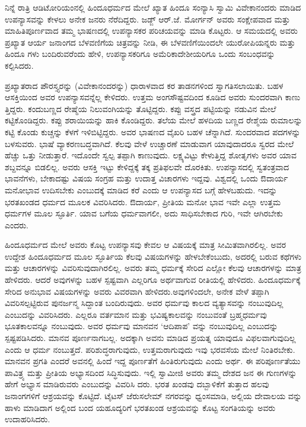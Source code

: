 ನಿನ್ನೆ ರಾತ್ರಿ ಆಡಿಟೋರಿಯಂನಲ್ಲಿ ಹಿಂದೂಧರ್ಮದ ಮೇಲೆ ಖ್ಯಾತ ಹಿಂದೂ ಸಂನ್ಯಾಸಿ ಸ್ವಾಮಿ ವಿವೇಕಾನಂದರು ಮಾಡಿದ ಉಪನ್ಯಾಸವನ್ನು ಕೇಳಲು ಅನೇಕ ಜನರು ನೆರೆದಿದ್ದರು. ಜಡ್ಜ್​ ಆರ್​.ಜೆ. ಮೋರ್ಗನ್​ ಅವರು ಸಂಕ್ಷೇಪವಾದ ಮತ್ತು ಮಾಹಿತಿಪೂರ್ಣವಾದ ತಮ್ಮ ಭಾಷಣದಲ್ಲಿ ಉಪನ್ಯಾಸಕರ ಪರಿಚಯವನ್ನು ಮಾಡಿ ಕೊಟ್ಟರು. ಆ ಸಮಯದಲ್ಲಿ ಅವರು ಪ್ರಖ್ಯಾತ ಆರ್ಯ ಜನಾಂಗದ ಬೆಳವಣಿಗೆಯ ಚಿತ್ರವನ್ನು ನೀಡಿ, ಈ ಬೆಳವಣಿಗೆಯಿಂದಲೇ ಯುರೋಪಿಯನ್ನರು ಮತ್ತು ಹಿಂದೂ ಗಳು ಬಂದಿರುವರೆಂದು ಹೇಳಿ, ಉಪನ್ಯಾಸಕರಿಗೂ ಅಮೆರಿಕಾದೇಶೀಯರಿಗೂ ಒಂದು ಸಂಬಂಧವನ್ನು ಕಲ್ಪಿಸಿದರು.

ಪ್ರಖ್ಯಾತರಾದ ಪೌರಸ್ತ್ಯರನ್ನು (ವಿವೇಕಾನಂದರನ್ನು) ಧಾರಾಳವಾದ ಕರ ತಾಡನಗಳಿಂದ ಸ್ವಾಗತಿಸಲಾಯಿತು. ಬಹಳ ಆಸಕ್ತಿಯಿಂದ ಅವರ ಉಪನ್ಯಾಸವನ್ನೆಲ್ಲ ಕೇಳಿದರು. ಉತ್ತಮ ಅಂಗಸೌಷ್ಟವದಿಂದ ಕೂಡಿದ ಅವರು ಸುಂದರವಾಗಿ ಕಾಣು ತ್ತಿದ್ದರು. ಕಂದುಬಣ್ಣದ ರೇಷ್ಮೆಯ ನಿಲುವಂಗಿಯನ್ನು ತೊಟ್ಟಿದ್ದರು. ಕಪ್ಪು ವಸ್ತ್ರದ ಪಟ್ಟಿಯನ್ನು ನಡುವಿನ ಮೇಲೆ ಕಟ್ಟಿಕೊಂಡಿದ್ದರು. ಕಪ್ಪು ಶರಾಯಿಯನ್ನು ಹಾಕಿ ಕೊಂಡಿದ್ದರು. ತಲೆಯ ಮೇಲೆ ಹಳದಿಯ ಬಣ್ಣದ ರೇಶ್ಮೆಯ ರುಮಾಲನ್ನು ಕಟ್ಟಿ ಕೊಂಡು ಕುಚ್ಚನ್ನು ಕೆಳಗೆ ಇಳಿಬಿಟ್ಟಿದ್ದರು. ಅವರ ಭಾಷಣದ ವೈಖರಿ ಬಹಳ ಚೆನ್ನಾಗಿದೆ. ಸುಂದರವಾದ ಪದಗಳನ್ನು ಬಳಸುವರು. ಭಾಷೆ ವ್ಯಾಕರಣಬದ್ಧವಾಗಿದೆ. ಕೆಲವು ವೇಳೆ ಉಚ್ಚಾರಣೆ ಮಾಡುವಾಗ ಯಾವುದಾದರೂ ಸ್ವರದ ಮೇಲೆ ಹೆಚ್ಚು ಒತ್ತು ನೀಡುತ್ತಾರೆ. ಇದೊಂದೇ ಸ್ವಲ್ಪ ತಪ್ಪಾಗಿ ಕಾಣುವುದು. ಲಕ್ಷ್ಯವಿಟ್ಟು ಕೇಳುತ್ತಿದ್ದ ಶೋತೃಗಳು ಅವರ ಯಾವ ಶಬ್ದವನ್ನೂ ಬಿಡಲಿಲ್ಲ. ಅವರು ಆಸಕ್ತಿ ಇಟ್ಟು ಕೇಳಿದ್ದಕ್ಕೆ ತಕ್ಕ ಪ್ರತಿಫಲವೇ ದೊರಕಿತು. ಉಪನ್ಯಾಸದಲ್ಲಿ ಸ್ವತಂತ್ರವಾದ ಭಾವನೆಗಳು, ಬೇಕಾದಷ್ಟು ವಿಷಯ ಸಂಗ್ರಹ ಮತ್ತು ಉದಾತ್ತ ವಿಚಾರಗಳು ಇದ್ದವು. ವಿಶ್ವದಲ್ಲಿ ಒಂದು ಔದಾರ್ಯ ಮನೋಭಾವ ಉದಿಸಬೇಕು ಎಂಬುದಕ್ಕೆ ಮಾಡಿದ ಕರೆ ಎಂದು ಆ ಉಪನ್ಯಾಸದ ಬಗ್ಗೆ ಹೇಳಬಹುದು. ಇದನ್ನು ಭರತಖಂಡದ ಧರ್ಮದ ಮೂಲಕ ವಿವರಿಸಿದರು. ಔದಾರ್ಯ, ಪ್ರೀತಿಯ ಮನೋ ಭಾವ ಇವೇ ಎಲ್ಲಾ ಉತ್ತಮ ಧರ್ಮಗಳ ಮೂಲ ಸ್ಫೂರ್ತಿ. ಯಾವ ಬಗೆಯ ಧರ್ಮವಾಗಲೀ, ಅದು ಸಾಧಿಸಬೇಕಾದ ಗುರಿ, ಇವೇ ಆಗಿರಬೇಕು ಎಂದರು.

ಹಿಂದೂಧರ್ಮದ ಮೇಲೆ ಅವರು ಕೊಟ್ಟ ಉಪನ್ಯಾಸವು ಕೇವಲ ಆ ವಿಷಯಕ್ಕೆ ಮಾತ್ರ ಸೀಮಿತವಾಗಿರಲಿಲ್ಲ. ಅವರ ಉದ್ದೇಶ ಹಿಂದೂಧರ್ಮದ ಮೂಲ ಸ್ಫೂರ್ತಿಯ ಕೆಲವು ವಿಷಯಗಳನ್ನು ಹೇಳಬೇಕೆಂಬುದು, ಅದರಲ್ಲಿ ಬರುವ ಕಥೆಗಳು ಮತ್ತು ಆಚಾರಗಳನ್ನು ವಿವರಿಸುವುದಾಗಿರಲಿಲ್ಲ. ಅವರು ತಮ್ಮ ಧರ್ಮಕ್ಕೆ ಸೇರಿದ ಎಲ್ಲೋ ಕೆಲವು ಆಚಾರಗಳನ್ನು ಮಾತ್ರ ಹೇಳಿದರು. ಆದರೆ ಅವುಗಳನ್ನು ಬಹಳ ಸ್ಪಷ್ಟವಾಗಿ ಎಲ್ಲರಿಗೂ ಅರ್ಥವಾಗುವ ರೀತಿಯಲ್ಲಿ ಹೇಳಿದರು. ಹಿಂದೂಧರ್ಮಕ್ಕೆ ಸೇರಿದ ಅನುಭಾವ ವಿಷಯಗಳನ್ನು ಅವರು ವಿವರವಾಗಿ ಹೇಳಿದರು.ಅವುಗಳಿಂದಲೇ, ಅನೇಕ ವೇಳೆ ತಪ್ಪಾಗಿ ವಿವರಿಸಲ್ಪಟ್ಟಿರುವ ಪುನರ್ಜನ್ಮ ಸಿದ್ದಾಂತ ಬಂದಿರುವುದು. ಅವರ ಧರ್ಮವು ಕಾಲದ ವ್ಯತ್ಯಾಸವನ್ನು ನಂಬುವುದಿಲ್ಲ ಎಂಬುದನ್ನು ವಿವರಿಸಿದರು. ಎಲ್ಲರೂ ವರ್ತಮಾನ ಮತ್ತು ಭವಿಷ್ಯಕಾಲವನ್ನು ನಂಬುವಂತೆ ಬ್ರಹ್ಮಧರ್ಮವು ಭೂತಕಾಲವನ್ನೂ ನಂಬುವುದು. ಅವರ ಧರ್ಮವು ಮಾನವನ ‘ಆದಿಪಾಪ’ ವನ್ನು ನಂಬುವುದಿಲ್ಲ ಎಂಬುದನ್ನು ಸ್ಪಷ್ಟಪಡಿಸಿದರು. ಮಾನವ ಪೂರ್ಣನಾಗಬಲ್ಲ. ಅದಕ್ಕಾಗಿ ಅವನು ಮಾಡಿದ ಪ್ರಯತ್ನ ಯಾವುದೂ ವಿಫಲವಾಗುವುದಿಲ್ಲ ಎಂದು ಆ ಧರ್ಮ ನಂಬುತ್ತದೆ. ಪರಿಶುದ್ಧರಾಗುವುದು, ಉತ್ತಮರಾಗುವುದು ಇವು ಭರವಸೆಯ ಮೇಲೆ ನಿಂತಿರಬೇಕು. ಮಾನವನ ಪ್ರಗತಿ ಎಂದರೆ ಅವನಲ್ಲಿ ಹಿಂದೆ ಇದ್ದ ಪೂರ್ಣತೆಗೆ ಹಿಂತಿರುಗುವುದು ಎಂದು ಅರ್ಥ. ಈ ಪರಿಪೂರ್ಣತೆಯು ಪಾವಿತ್ರ್ಯ ಮತ್ತು ಪ್ರೀತಿಯ ಅಭ್ಯಾಸದಿಂದ ಸಿದ್ಧಿಸುವುದು. ಇಲ್ಲಿ ಸ್ವಾಮೀಜಿ ಅವರು ತಮ್ಮ ದೇಶದ ಜನ ಈ ಗುಣಗಳನ್ನು ಹೇಗೆ ಅಭ್ಯಾಸ ಮಾಡಿರುವರು ಎಂಬುದನ್ನು ವಿವರಿಸಿ ದರು. ಭರತ ಖಂಡವು ದಬ್ಬಾಳಿಕೆಗೆ ತುತ್ತಾದ ಹಲವು ಜನಾಂಗಗಳಿಗೆ ಆಶ್ರಯವನ್ನು ಕೊಟ್ಟಿದೆ. ಟೈಟಸ್​ ಜೆರುಸಲೇಮ್​ ನಗರವನ್ನು ಧ್ವಂಸಮಾಡಿ, ಅಲ್ಲಿಯ ದೇವಾಲಯ ವನ್ನು ಹಾಳು ಮಾಡಿದಾಗ ಅಲ್ಲಿಂದ ಬಂದ ಯಹೂದ್ಯರಿಗೆ ಭರತಖಂಡ ಆಶ್ರಯವನ್ನು ಕೊಟ್ಟ ಸಂಗತಿಯನ್ನು ಅವರು ಉದಾಹರಿಸಿದರು.

